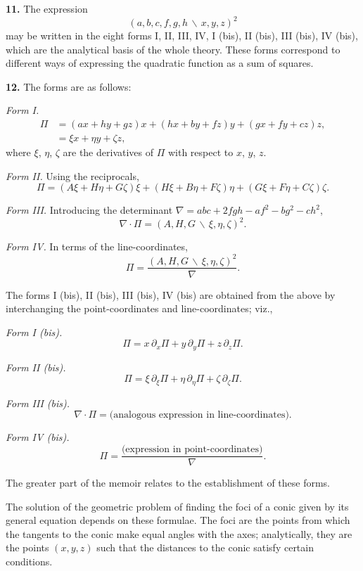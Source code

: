 \documentclass[11pt,a4paper]{book}
\begin{document}
\textbf{11.} The expression
\[(a,b,c,f,g,h\,\backslash\!\!\,x,y,z)^{2}\]
may be written in the eight forms I, II, III, IV, I (bis), II (bis), III (bis), IV (bis),
which are the analytical basis of the whole theory. These forms correspond to different
ways of expressing the quadratic function as a sum of squares.

\textbf{12.} The forms are as follows:

\textit{Form I.}
\begin{align*}
\Pi &= (ax+hy+gz)x + (hx+by+fz)y + (gx+fy+cz)z,\\
&= \xi x + \eta y + \zeta z,
\end{align*}
where $\xi$, $\eta$, $\zeta$ are the derivatives of $\Pi$ with respect to $x$, $y$, $z$.

\textit{Form II.} Using the reciprocals,
\[\Pi = (A\xi+H\eta+G\zeta)\xi + (H\xi+B\eta+F\zeta)\eta + (G\xi+F\eta+C\zeta)\zeta.\]

\textit{Form III.} Introducing the determinant $\nabla = abc + 2fgh - af^{2} - bg^{2} - ch^{2}$,
\[\nabla \cdot \Pi = (A,H,G\,\backslash\!\!\,\xi,\eta,\zeta)^{2}.\]

\textit{Form IV.} In terms of the line-coordinates,
\[\Pi = \frac{(A,H,G\,\backslash\!\!\,\xi,\eta,\zeta)^{2}}{\nabla}.\]

\newpage

The forms I (bis), II (bis), III (bis), IV (bis) are obtained from the above by
interchanging the point-coordinates and line-coordinates; viz.,

\textit{Form I (bis).}
\[\Pi = x\,\partial_{x}\Pi + y\,\partial_{y}\Pi + z\,\partial_{z}\Pi.\]

\textit{Form II (bis).}
\[\Pi = \xi\,\partial_{\xi}\Pi + \eta\,\partial_{\eta}\Pi + \zeta\,\partial_{\zeta}\Pi.\]

\textit{Form III (bis).}
\[\nabla \cdot \Pi = \text{(analogous expression in line-coordinates)}.\]

\textit{Form IV (bis).}
\[\Pi = \frac{\text{(expression in point-coordinates)}}{\nabla}.\]

The greater part of the memoir relates to the establishment of these forms.

The solution of the geometric problem of finding the foci of a conic given by its
general equation depends on these formulae. The foci are the points from which the
tangents to the conic make equal angles with the axes; analytically, they are the points
$(x,y,z)$ such that the distances to the conic satisfy certain conditions.
\end{document}
